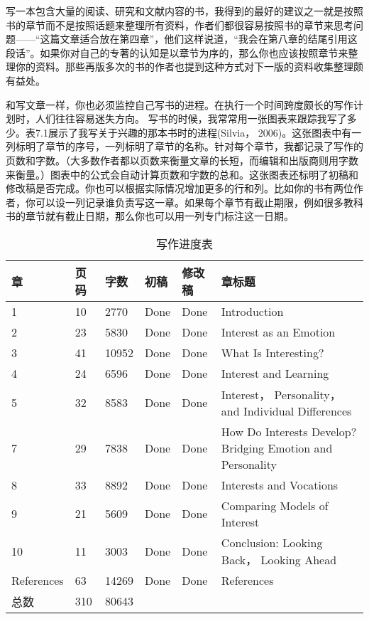 写一本包含大量的阅读、研究和文献内容的书，我得到的最好的建议之一就是按照书的章节而不是按照话题来整理所有资料，作者们都很容易按照书的章节来思考问题——“这篇文章适合放在第四章”，他们这样说道，“我会在第八章的结尾引用这段话”。如果你对自己的专著的认知是以章节为序的，那么你也应该按照章节来整理你的资料。那些再版多次的书的作者也提到这种方式对下一版的资料收集整理颇有益处。

和写文章一样，你也必须监控自己写书的进程。在执行一个时间跨度颇长的写作计划时，人们往往容易迷失方向。 写书的时候，我常常用一张图表来跟踪我写了多少。表7.1展示了我写关于兴趣的那本书时的进程(Silvia， 2006)。这张图表中有一列标明了章节的序号，一列标明了章节的名称。针对每个章节，我都记录了写作的页数和字数。（大多数作者都以页数来衡量文章的长短，而编辑和出版商则用字数来衡量。）图表中的公式会自动计算页数和字数的总和。这张图表还标明了初稿和修改稿是否完成。你也可以根据实际情况增加更多的行和列。比如你的书有两位作者，你可以设一列记录谁负责写这一章。如果每个章节有截止期限，例如很多教科书的章节就有截止日期，那么你也可以用一列专门标注这一日期。

\begin{table}[htbp]
  \centering
  \caption{写作进度表}
  \begin{tabular}{p{}p{}|p{}p{}|p{}p{}}
    \hline
    章 & 页码 & 字数 & 初稿 & 修改稿 & 章标题 \\
    \hline
    1 & 10 & 2770 & Done & Done & Introduction \\
    2 & 23 & 5830 & Done & Done & Interest as an Emotion \\
    3 & 41 & 10952 & Done & Done & What Is Interesting? \\
    4 & 24 & 6596 & Done & Done & Interest and Learning \\
    5 & 32 & 8583 & Done & Done & Interest， Personality， and Individual Differences \\
    7 & 29 & 7838 & Done & Done & How Do Interests Develop? Bridging Emotion and Personality \\
    8 & 33 & 8892 & Done & Done & Interests and Vocations \\
    9 & 21 & 5609 & Done & Done & Comparing Models of Interest \\
    10 & 11 & 3003 & Done & Done & Conclusion: Looking Back， Looking Ahead \\
    References & 63 & 14269 & Done & Done & References \\
    总数 & 310 & 80643 &  &  &  \\
    \hline
  \end{tabular}
\end{table}

